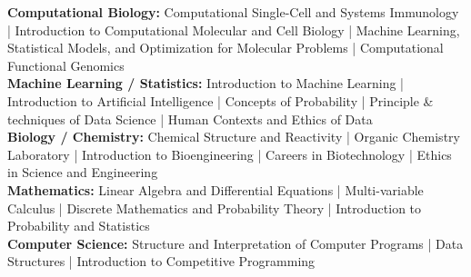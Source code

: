 \newcommand{\coursework}[2]{
    \vspace{4pt}
    \textbf{#1:} #2 \\
}

\coursework{Computational Biology}{Computational Single-Cell and Systems Immunology | Introduction to Computational Molecular and Cell Biology | Machine Learning, Statistical Models, and Optimization for Molecular Problems | Computational Functional Genomics}

\coursework{Machine Learning / Statistics}{Introduction to Machine Learning | Introduction to Artificial Intelligence | Concepts of Probability | Principle \& techniques of Data Science | Human Contexts and Ethics of Data}

\coursework{Biology / Chemistry}{Chemical Structure and Reactivity | Organic Chemistry Laboratory | Introduction to Bioengineering | Careers in Biotechnology | Ethics in Science and Engineering}

\coursework{Mathematics}{Linear Algebra and Differential Equations | Multi-variable Calculus | Discrete Mathematics and Probability Theory | Introduction to Probability and Statistics}

\coursework{Computer Science}{Structure and Interpretation of Computer Programs | Data Structures | Introduction to Competitive Programming}
